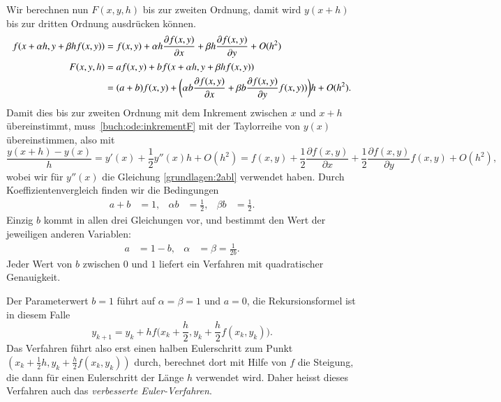 Wir berechnen nun $F(x,y,h)$ bis zur zweiten Ordnung, damit wird 
$y(x+h)$ bis zur dritten Ordnung ausdrücken können.
\begin{align}
f(x+\alpha h, y + \beta h f(x,y))
&=
f(x,y)+\alpha h\frac{\partial f(x,y)}{\partial x}
+ \beta h \frac{\partial f(x,y)}{\partial y} + O(h^2)
\notag
\\
F(x,y,h)
&=
af(x,y) + bf(x+\alpha h, y + \beta h f(x,y))
\notag
\\
&=
(a+b)f(x,y) + \biggl(\alpha b\frac{\partial f(x,y)}{\partial x}
+ \beta b\frac{\partial f(x,y)}{\partial y} f(x,y))\biggr)h+O(h^2).
\label{buch:ode:inkrementF}
\end{align}
Damit dies bis zur zweiten Ordnung mit dem Inkrement zwischen $x$ und $x+h$
übereinstimmt, muss~\eqref{buch:ode:inkrementF} mit der Taylorreihe
von $y(x)$ übereinstimmen, also mit
\begin{equation}
\frac{y(x+h)-y(x)}{h}=y'(x) + \frac12y''(x)h + O(h^2)
=f(x,y) + \frac12\frac{\partial f(x,y)}{\partial x}
+\frac12\frac{\partial f(x,y)}{\partial y}f(x,y) + O(h^2),
\label{buch:ode:ytaylor}
\end{equation}
wobei wir für $y''(x)$ die Gleichung \eqref{grundlagen:2abl} verwendet haben.
Durch Koeffizientenvergleich finden wir die Bedingungen
\[
\begin{aligned}
a+b&=1,&
\alpha b&=\frac12,&
\beta b&=\frac12.
\end{aligned}
\]
Einzig $b$ kommt in allen drei Gleichungen vor, und bestimmt den Wert der
jeweiligen anderen Variablen:
\[
\begin{aligned}
a&=1-b,&\alpha&= \beta=\frac{1}{2b}.
\end{aligned}
\]
Jeder Wert von $b$ zwischen $0$ und $1$ liefert ein Verfahren mit quadratischer
Genauigkeit.

Der Parameterwert $b=1$ führt auf $\alpha=\beta=1$ und $a=0$, die
Rekursionsformel ist in diesem Falle
\begin{equation}
y_{k+1}=y_{k}+hf\biggl(x_k+\frac{h}2,y_k+\frac{h}2 f(x_k,y_k)\biggr).
\label{buch:ode:improved-euler}
\end{equation}
Das Verfahren führt also erst einen halben Eulerschritt zum Punkt
$(x_k+\frac12h,y_k+\frac{h}2f(x_k,y_k))$ durch, berechnet dort mit Hilfe
von $f$ die Steigung, die dann für einen Eulerschritt der Länge $h$
verwendet wird.
Daher heisst dieses Verfahren auch das {\em verbesserte Euler-Verfahren}.
%

